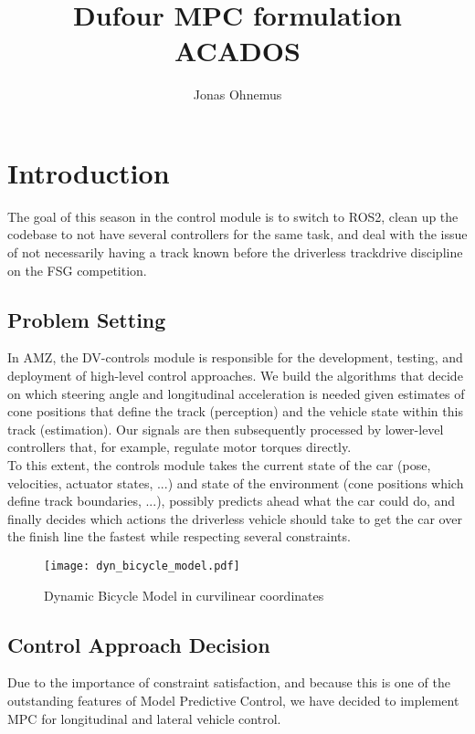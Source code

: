 \documentclass[
a4paper, %
10pt, %
notitlepage,
english]{CSUniSchoolLabReport}
\title{Dufour MPC formulation \\ ACADOS}
\author{Jonas Ohnemus}
\begin{document}
\maketitle

{\let\clearpage\relax \vspace{100pt}\tableofcontents} 
\newpage

\chapter{Introduction}

The goal of this season in the control module is to switch to ROS2, clean up the codebase to not have several controllers for the same task, and deal with the issue of not necessarily having a track known before the driverless trackdrive discipline on the FSG competition.

\section{Problem Setting}

In AMZ, the DV-controls module is responsible for the development, testing, and deployment of high-level control approaches. We build the algorithms that decide on which steering angle and longitudinal acceleration is needed given estimates of cone positions that define the track (perception) and the vehicle state within this track (estimation). Our signals are then subsequently processed by lower-level controllers that, for example, regulate motor torques directly.\\
To this extent, the controls module takes the current state of the car (pose, velocities, actuator states, ...) and state of the environment (cone positions which define track boundaries, ...), possibly predicts ahead what the car could do, and finally decides which actions the driverless vehicle should take to get the car over the finish line the fastest while respecting several constraints.

\begin{figure}[H]
	\centering
	\texttt{[image: dyn\_bicycle\_model.pdf]}
	\caption{Dynamic Bicycle Model in curvilinear coordinates}
\end{figure}

\section{Control Approach Decision}

Due to the importance of constraint satisfaction, and because this is one of the outstanding features of Model Predictive Control, we have decided to implement MPC for longitudinal and lateral vehicle control.
\end{document}
